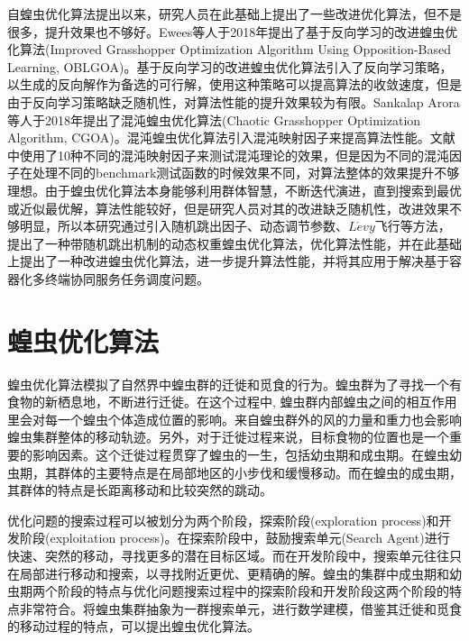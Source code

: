 自蝗虫优化算法提出以来，研究人员在此基础上提出了一些改进优化算法，但不是很多，提升效果也不够好。Ewees等人于2018年提出了基于反向学习的改进蝗虫优化算法(Improved Grasshopper Optimization Algorithm Using Opposition-Based Learning, OBLGOA)\cite{ewees2018improved}。基于反向学习的改进蝗虫优化算法引入了反向学习策略，以生成的反向解作为备选的可行解，使用这种策略可以提高算法的收敛速度，但是由于反向学习策略缺乏随机性，对算法性能的提升效果较为有限。Sankalap Arora等人于2018年提出了混沌蝗虫优化算法(Chaotic Grasshopper Optimization Algorithm, CGOA)\cite{arora2018chaotic}。混沌蝗虫优化算法引入混沌映射因子来提高算法性能。文献中使用了10种不同的混沌映射因子来测试混沌理论的效果，但是因为不同的混沌因子在处理不同的benchmark测试函数的时候效果不同，对算法整体的效果提升不够理想。由于蝗虫优化算法本身能够利用群体智慧，不断迭代演进，直到搜索到最优或近似最优解，算法性能较好，但是研究人员对其的改进缺乏随机性，改进效果不够明显，所以本研究通过引入随机跳出因子、动态调节参数、$L\acute{e}vy$飞行等方法，提出了一种带随机跳出机制的动态权重蝗虫优化算法，优化算法性能，并在此基础上提出了一种改进蝗虫优化算法，进一步提升算法性能，并将其应用于解决基于容器化多终端协同服务任务调度问题。

\section{蝗虫优化算法}\label{sec:task_scheduling_GOA}


蝗虫优化算法模拟了自然界中蝗虫群的迁徙和觅食的行为。蝗虫群为了寻找一个有食物的新栖息地，不断进行迁徙。在这个过程中, 蝗虫群内部蝗虫之间的相互作用里会对每一个蝗虫个体造成位置的影响。来自蝗虫群外的风的力量和重力也会影响蝗虫集群整体的移动轨迹。另外，对于迁徙过程来说，目标食物的位置也是一个重要的影响因素。这个迁徙过程贯穿了蝗虫的一生，包括幼虫期和成虫期。在蝗虫幼虫期，其群体的主要特点是在局部地区的小步伐和缓慢移动。而在蝗虫的成虫期，其群体的特点是长距离移动和比较突然的跳动。

优化问题的搜索过程可以被划分为两个阶段，探索阶段(exploration process)和开发阶段(exploitation process)。在探索阶段中，鼓励搜索单元(Search Agent)进行快速、突然的移动，寻找更多的潜在目标区域。而在开发阶段中，搜索单元往往只在局部进行移动和搜索，以寻找附近更优、更精确的解。蝗虫的集群中成虫期和幼虫期两个阶段的特点与优化问题搜索过程中的探索阶段和开发阶段这两个阶段的特点非常符合。将蝗虫集群抽象为一群搜索单元，进行数学建模，借鉴其迁徙和觅食的移动过程的特点，可以提出蝗虫优化算法。

